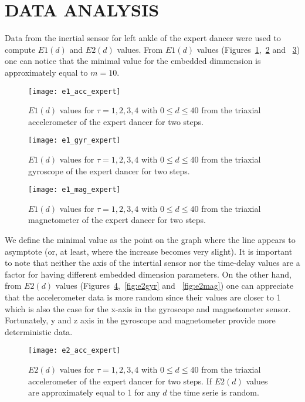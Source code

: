 \documentclass{sigchi}
\begin{document}
\section{DATA ANALYSIS}
Data from the inertial sensor for left ankle of the expert dancer were used
to compute $E1(d)$ and $E2(d)$ values. From $E1(d)$ values 
(Figures~\ref{fig:e1acc},~\ref{fig:e1gyr} and ~\ref{fig:e1mag})
one can notice that the minimal value for the embedded dimmension is approximately
equal to $m=10$. 
  \begin{figure}[htbp!] 
  \centering    
  \texttt{[image: e1\_acc\_expert]}
  \caption[PA]{$E1(d)$ values for $\tau=1,2,3,4$ with $0 \leq d \leq 40$
  from the triaxial accelerometer of the expert dancer for two steps.}
  \label{fig:e1acc}
  \end{figure}
    \begin{figure}[htbp!] 
  \centering    
  \texttt{[image: e1\_gyr\_expert]}
  \caption[PA]{$E1(d)$ values for $\tau=1,2,3,4$ with $0 \leq d \leq 40$
  from the triaxial gyroscope of the expert dancer for two steps.}
  \label{fig:e1gyr}
  \end{figure}
      \begin{figure}[htbp!] 
  \centering    
  \texttt{[image: e1\_mag\_expert]}
  \caption[PA]{$E1(d)$ values for $\tau=1,2,3,4$ with $0 \leq d \leq 40$
  from the triaxial magnetometer of the expert dancer for two steps.}
  \label{fig:e1mag}
  \end{figure}
We define the minimal value as the point on the graph where the 
line appears to asymptote (or, at least, where the increase becomes very slight). 
It is important to note that neither the axis of the intertial sensor 
nor the time-delay values are a factor for having different embedded dimension parameters.
On the other hand, from $E2(d)$ values (Figures~\ref{fig:e2acc},~\ref{fig:e2gyr} and ~\ref{fig:e2mag})
one can appreciate that the accelerometer data is more random since their values are closer to 1
which is also the case for the x-axis in the gyroscope and magnetometer sensor. 
Fortunately, y and z axis in the gyroscope and magnetometer provide more deterministic data.
    \begin{figure}[htbp!] 
  \centering    
  \texttt{[image: e2\_acc\_expert]}
  \caption[PA]{$E2(d)$ values for $\tau=1,2,3,4$ with $0 \leq d \leq40 $
  from the triaxial accelerometer of the expert dancer for two steps.
  If $E2(d)$ values are approximately equal to 1 for any $d$ the time serie is random.
  }
  \label{fig:e2acc}
  \end{figure}
\end{document}
